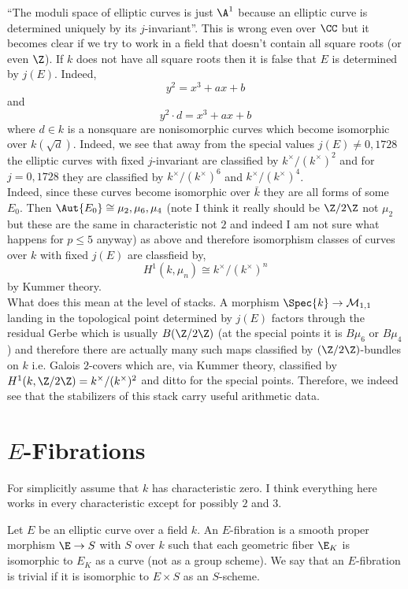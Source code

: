 \documentclass[12pt]{article}
\begin{document}
``The moduli space of elliptic curves is just $\A^1$ because an elliptic curve is determined uniquely by its $j$-invariant''. This is wrong even over $\CC$ but it becomes clear if we try to work in a field that doesn't contain all square roots (or even $\Z$). If $k$ does not have all square roots then it is false that $E$ is determined by $j(E)$. Indeed,
\[ y^2 = x^3 + a x + b \]
and 
\[ y^2 \cdot d = x^3 + ax + b \]
where $d \in k$ is a nonsquare are nonisomorphic curves which become isomorphic over $k(\sqrt{d})$. Indeed, we see that away from the special values $j(E) \neq 0, 1728$ the elliptic curves with fixed $j$-invariant are classified by $k^\times / (k^\times)^2$ and for $j = 0, 1728$ they are classified by $k^\times / (k^\times)^6$ and $k^\times / (k^\times)^4$. 
\bigskip\\
Indeed, since these curves become isomorphic over $\bar{k}$ they are all forms of some $E_0$. Then $\Aut{E_0} \cong \mu_2, \mu_6, \mu_4$ (note I think it really should be $\Z / 2 \Z$ not $\mu_2$ but these are the same in characteristic not $2$ and indeed I am not sure what happens for $p \le 5$ anyway) as above and therefore isomorphism classes of curves over $k$ with fixed $j(E)$ are classfieid by,
\[ H^1(k, \mu_n) \cong k^\times / (k^\times)^n \]
by Kummer theory. 
\bigskip\\
What does this mean at the level of stacks. A morphism $\Spec{k} \to \mathcal{M}_{1,1}$ landing in the topological point determined by $j(E)$ factors through the residual Gerbe which is usually $B(\Z/2\Z)$ (at the special points it is $B \mu_6$ or $B \mu_4$) and therefore there are actually many such maps classified by $(\Z / 2 \Z)$-bundles on $k$ i.e. Galois $2$-covers which are, via Kummer theory, classified by $H^1(k, \Z / 2 \Z) = k^\times / (k^\times)^2$ and ditto for the special points. Therefore, we indeed see that the stabilizers of this stack carry useful arithmetic data. 

\section{$E$-Fibrations}

For simplicitly assume that $k$ has characteristic zero. I think everything here works in every characteristic except for possibly $2$ and $3$.

\begin{defn}
Let $E$ be an elliptic curve over a field $k$. An $E$-fibration is a smooth proper morphism $\E \to S$ with $S$ over $k$ such that each geometric fiber $\E_K$ is isomorphic to $E_K$ as a curve (not as a group scheme). We say that an $E$-fibration is trivial if it is isomorphic to $E \times S$ as an $S$-scheme.  
\end{defn}
\end{document}
